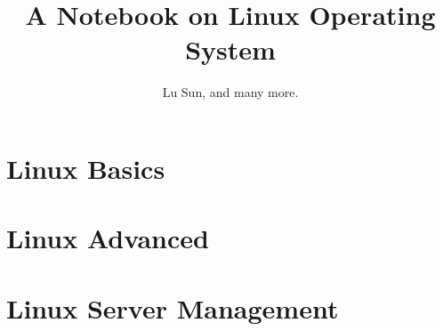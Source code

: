 \documentclass[krantz1,ChapterTOCs]{krantz}
\begin{document}
\frontmatter

\title{A Notebook on Linux Operating System}
\author{Lu Sun, and many more.}

\maketitle


\tableofcontents


\listoffigures
\listoftables
%
%

\mainmatter

\part{Linux Basics}













\part{Linux Advanced}









\part{Linux Server Management}



\end{document}
